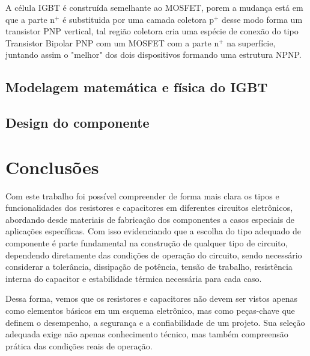 \documentclass[12pt]{article}
\begin{document}
        A célula IGBT é construída semelhante ao MOSFET, porem a mudança está em que a parte n${^+}$ é substituida por uma camada coletora p${^+}$ desse modo forma um transistor PNP vertical, tal região coletora cria uma espécie de conexão do tipo Transistor Bipolar PNP com um MOSFET com a parte n${^+}$ na superfície, juntando assim o "melhor" dos dois dispositivos formando uma estrutura NPNP.

        \subsection{Modelagem matemática e física do IGBT}
        \subsection{Design do componente}
        \subsection{}
        \subsection{}

\section{Conclusões}

    Com este trabalho foi possível compreender de forma mais clara os tipos e funcionalidades dos resistores e capacitores em diferentes circuitos eletrônicos, abordando desde materiais de fabricação dos componentes a casos especiais de aplicações específicas. Com isso evidenciando que a escolha do tipo adequado de componente é parte fundamental na construção de qualquer tipo de circuito, dependendo diretamente das condições de operação do circuito, sendo necessário considerar a tolerância, dissipação de potência, tensão de trabalho, resistência interna do capacitor e estabilidade térmica necessária para cada caso.

    Dessa forma, vemos que os resistores e capacitores não devem ser vistos apenas como elementos básicos em um esquema eletrônico, mas como peças-chave que definem o desempenho, a segurança e a confiabilidade de um projeto. Sua seleção adequada exige não apenas conhecimento técnico, mas também compreensão prática das condições reais de operação.

\newpage


\end{document}
